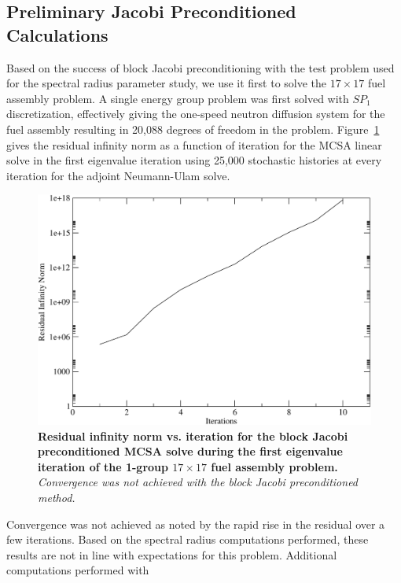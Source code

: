 \subsection{Preliminary Jacobi Preconditioned Calculations}
\label{subsec:jacobi_prec_assembly_calc}
Based on the success of block Jacobi preconditioning with the test
problem used for the spectral radius parameter study, we use it first
to solve the $17 \times 17$ fuel assembly problem. A single energy
group problem was first solved with $SP_1$ discretization, effectively
giving the one-speed neutron diffusion system for the fuel assembly
resulting in 20,088 degrees of freedom in the
problem. Figure~\ref{fig:block_jacobi_res_mcsa} gives the residual
infinity norm as a function of iteration for the MCSA linear solve in
the first eigenvalue iteration using 25,000 stochastic histories at
every iteration for the adjoint Neumann-Ulam solve.
\begin{figure}[t!]
  \begin{center}
    \includegraphics[width=6in]{chapters/spn_equations/block_jacobi_res.pdf}
  \end{center}
  \caption{\textbf{Residual infinity norm vs. iteration for the block
      Jacobi preconditioned MCSA solve during the first eigenvalue
      iteration of the 1-group $17 \times 17$ fuel assembly problem.}
    \textit{Convergence was not achieved with the block Jacobi
      preconditioned method.}}
  \label{fig:block_jacobi_res_mcsa}
\end{figure}
Convergence was not achieved as noted by the rapid rise in the
residual over a few iterations. Based on the spectral radius
computations performed, these results are not in line with
expectations for this problem. Additional computations performed with
